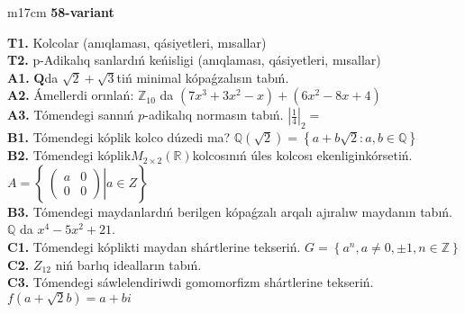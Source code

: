 \documentclass{article}
\begin{document}
\begin{tabular}{m{17cm}}
\textbf{58-variant}
\newline

\textbf{T1.} Kolcolar (anıqlaması, qásiyetleri, mısallar) \\
\textbf{T2.} p-Adikalıq sanlardıń keńisligi (anıqlaması, qásiyetleri, mısallar) \\
\textbf{A1.} \(\mathbf{Q}\)da \(\sqrt{2} + \sqrt{3}\)tiń minimal kópaǵzalısın tabıń. \\
\textbf{A2.} Ámellerdi orınlań: \(\mathbb{Z}_{10}\) da \(\left( 7x^{3} + 3x^{2} - x \right) + \left( 6x^{2} - 8x + 4 \right)\) \\
\textbf{A3.} Tómendegi sannıń \(p\)-adikalıq normasın tabıń. \(|\frac{1}{4}|_{2} =\) \\
\textbf{B1.} Tómendegi kóplik kolco dúzedi ma? \(\mathbb{Q}\left( \sqrt{2} \right) = \left\{ a + b\sqrt{2}:a,b \in \mathbb{Q} \right\}\) \\
\textbf{B2.} Tómendegi kóplik\(M_{2 \times 2}\left( \mathbb{R} \right)\)kolcosınıń úles kolcosı ekenliginkórsetiń. \(A = \left\{ \left. \ \begin{pmatrix}
a & 0 \\
0 & 0
\end{pmatrix} \right|a \in Z \right\}\) \\
\textbf{B3.} Tómendegi maydanlardıń berilgen kópaǵzalı arqalı ajıralıw maydanın tabıń.
\(\mathbb{Q}\) da \(x^{4} - 5x^{2} + 21\). \\
\textbf{C1.} Tómendegi kóplikti maydan shártlerine tekseriń. \(G = \left\{ a^{n},a \neq 0, \pm 1,n \in \mathbb{Z} \right\}\) \\
\textbf{C2.} \(Z_{12}\) niń barlıq idealların tabıń. \\
\textbf{C3.} Tómendegi sáwlelendiriwdi gomomorfizm shártlerine tekseriń. \(f\left( a + \sqrt{2}b \right) = a + bi\) \\

\end{tabular}
\vspace{1cm}
\end{document}
